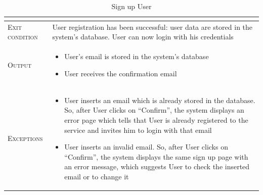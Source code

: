 \begin{table}[H]
\begin{tabular}[c]{|l|p{}|}
\begin{itemize}
                                        \end{itemize}\\
        \hline %
        \textsc{Exit condition}    &  User registration has been successful: user data are stored in the system’s database. User can now login with his credentials\\
    	\hline %
    	\textsc{Output}             &  \begin{itemize}
    	    \item User’s email is stored in the system’s database
            \item User receives the confirmation email

    	\end{itemize}\\
    	\hline %
    	\textsc{Exceptions}         &  \begin{itemize}
    	    \item User inserts an email which is already stored in the database. So, after User clicks on “Confirm”, the system displays an error page which tells that User is already registered to the service and invites him to login with that email
            \item User inserts an invalid email. So, after User clicks on “Confirm”, the system displays the same sign up page with an error message, which suggests User to check the inserted email or to change it

    	\end{itemize}\\
    	\hline %
        
    \end{tabular}
    \caption{\label{tab:user_sign_up}Sign up User}
\end{table}

